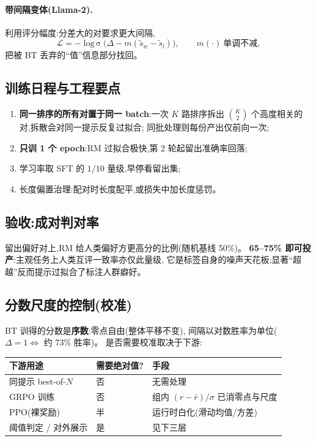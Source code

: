 \documentclass[UTF8, 11pt]{ctexart}
\DeclareMathOperator{\logsigmoid}{log\,\sigma}
\begin{document}
\paragraph{带间隔变体(Llama-2).}
利用评分幅度:分差大的对要求更大间隔,
\begin{equation}
\mathcal{L}=-\logsigmoid\bigl(\Delta-m(\tilde s_w-\tilde s_l)\bigr),
\qquad m(\cdot)\ \text{单调不减},
\label{eq:margin}
\end{equation}
把被 BT 丢弃的``值''信息部分找回。

\subsection{训练日程与工程要点}

\begin{enumerate}
  \item \textbf{同一排序的所有对置于同一 batch}:一次 $K$ 路排序拆出
        $\binom{K}{2}$ 个高度相关的对,拆散会对同一提示反复过拟合;
        同批处理则每份产出仅前向一次;
  \item \textbf{只训 1 个 epoch}:RM 过拟合极快,第 2 轮起留出准确率回落;
  \item 学习率取 SFT 的 $1/10$ 量级,早停看留出集;
  \item 长度偏置治理:配对时长度配平,或损失中加长度惩罚。
\end{enumerate}

\subsection{验收:成对判对率}

留出偏好对上,RM 给人类偏好方更高分的比例(随机基线 50\%)。
\textbf{65--75\% 即可投产}:主观任务上人类互评一致率亦仅此量级,
它是标签自身的噪声天花板;显著``超越''反而提示过拟合了标注人群癖好。

\subsection{分数尺度的控制(校准)}

BT 训得的分数是\textbf{序数}:零点自由(整体平移不变),
间隔以对数胜率为单位($\Delta{=}1\Leftrightarrow$ 约 73\% 胜率)。
是否需要校准取决于下游:

\begin{center}
\begin{tabular}{@{}lll@{}}
\toprule
下游用途 & 需要绝对值? & 手段 \\
\midrule
同提示 best-of-$N$ & 否 & 无需处理 \\
GRPO 训练 & 否 & 组内 $(r-\bar r)/\sigma$ 已消零点与尺度 \\
PPO(裸奖励) & 半 & 运行时白化(滑动均值/方差) \\
阈值判定 / 对外展示 & 是 & 见下三层 \\
\bottomrule
\end{tabular}
\end{center}
\end{document}
